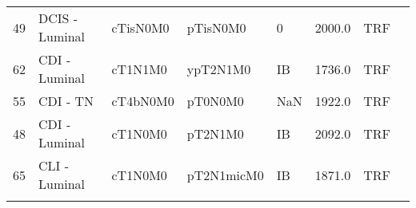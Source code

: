 \begin{longtable}{rlllllrl}
  49 & DCIS - Luminal & cTisN0M0 &              pTisN0M0 &     0 &                        2000.0 &          TRF \\
  62 & CDI - Luminal & cT1N1M0 &              ypT2N1M0 &    IB &                        1736.0 &          TRF \\
  55 & CDI - TN & cT4bN0M0 &               pT0N0M0 &   NaN &                        1922.0 &          TRF \\
  48 & CDI - Luminal & cT1N0M0 &               pT2N1M0 &    IB &                        2092.0 &          TRF \\
  65 & CLI - Luminal & cT1N0M0 &            pT2N1micM0 &    IB &                        1871.0 &          TRF \\
\noindent{\footnotesize{CDI: }}
\end{longtable}
